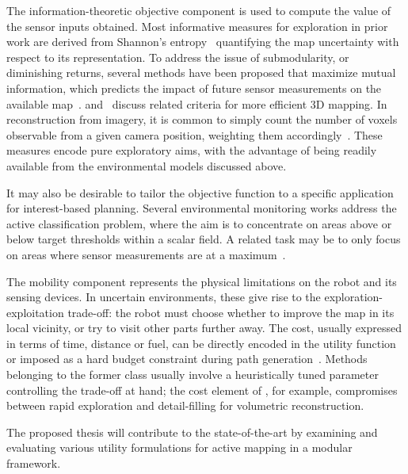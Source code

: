 The information-theoretic objective component is used to compute the value of the sensor inputs 
obtained. Most informative measures for exploration in prior work are derived from Shannon's 
entropy~\cite{Cover2006, Lim2015, Bourgault2002, Yang2014} quantifying the map uncertainty with respect to 
its representation. To address the issue of submodularity, or diminishing returns, several methods have been 
proposed that maximize mutual information, which predicts the impact of future sensor measurements on the 
available map~\cite{Hitz2015, Hollinger2014, Krause2008}. \citet{Charrow2015a} and~\citet{Carrillo2015a} 
discuss related criteria for more efficient 3D mapping. In reconstruction from imagery, it is common to 
simply count the number of voxels observable from a given camera position, weighting them 
accordingly~\cite{Bircher2016, Isler2016, Heng2015}. These measures encode pure exploratory aims, with the 
advantage of being readily available from the environmental models discussed above.

It may also be desirable to tailor the objective function to a specific application for interest-based 
planning. Several environmental monitoring works \cite{Gotovos2013, Hitz2014, Vivaldini2016} address the
active classification problem, where the aim is to concentrate on areas above or below target thresholds 
within a scalar field. A related task may be to only focus on areas where sensor measurements are at a 
maximum~\cite{Marchant2014}.

The mobility component represents the physical limitations on the robot and its sensing devices. In uncertain 
environments, these give rise to the exploration-exploitation trade-off: the 
robot must choose whether to improve the map in its local vicinity, or try to visit other parts further away. 
The cost, usually expressed in terms of time, distance or fuel, can be directly encoded in the utility 
function~\cite{Charrow2015a, Bircher2016, Heng2015} or imposed as a hard budget constraint during path 
generation~\cite{Hitz2015, Binney2013}. Methods belonging to the former class usually involve a heuristically 
tuned parameter controlling the trade-off at hand; the cost element of \citet{Heng2015}, for example, 
compromises between rapid exploration and detail-filling for volumetric reconstruction.

The proposed thesis will contribute to the state-of-the-art by examining and evaluating various 
utility formulations for active mapping in a modular framework.

